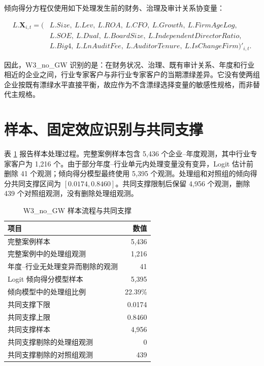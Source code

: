 \documentclass[12pt,a4paper]{article}
\begin{document}
倾向得分方程仅使用如下处理发生前的财务、治理及审计关系协变量：

\begin{equation}
\begin{aligned}
L.\mathbf{X}_{i,t}=\big(&L.Size,\ L.Lev,\ L.ROA,\ L.CFO,\ L.Growth,\ L.FirmAgeLog,\\
&L.SOE,\ L.Dual,\ L.BoardSize,\ L.IndependentDirectorRatio,\\
&L.Big4,\ L.LnAuditFee,\ L.AuditorTenure,\ L.IsChangeFirm\big)'_{i,t}.
\end{aligned}
\end{equation}

因此，W3\_no\_GW 识别的是：在财务状况、治理、既有审计关系、年度和行业相近的企业之间，行业专家客户与非行业专家客户的当期漂绿差异。它没有使两组企业按既有漂绿水平直接平衡，故应作为不含漂绿选择变量的敏感性规格，而非替代主规格。

\section{样本、固定效应识别与共同支撑}

表 \ref{tab:flow} 报告样本处理过程。完整案例样本包含 5,436 个企业--年度观测，其中行业专家客户为 1,216 个。由于部分年度--行业单元内处理变量没有变异，Logit 估计前删除 41 个观测；倾向得分模型最终使用 5,395 个观测。处理组和对照组的倾向得分共同支撑区间为 $[0.0174,0.8460]$。共同支撑限制后保留 4,956 个观测，删除 439 个对照组观测，没有删除处理组观测。

\begin{table}[htbp]
\centering
\caption{W3\_no\_GW 样本流程与共同支撑}
\label{tab:flow}
\begin{tabular}{lr}
\toprule
项目 & 数值 \\
\midrule
完整案例样本 & 5,436 \\
完整案例中的处理组观测 & 1,216 \\
年度--行业无处理变异而剔除的观测 & 41 \\
Logit 倾向得分模型样本 & 5,395 \\
倾向模型中的处理组比例 & 22.39\% \\
共同支撑下限 & 0.0174 \\
共同支撑上限 & 0.8460 \\
共同支撑样本 & 4,956 \\
共同支撑剔除的处理组观测 & 0 \\
共同支撑剔除的对照组观测 & 439 \\
\bottomrule
\end{tabular}
\end{table}
\end{document}
